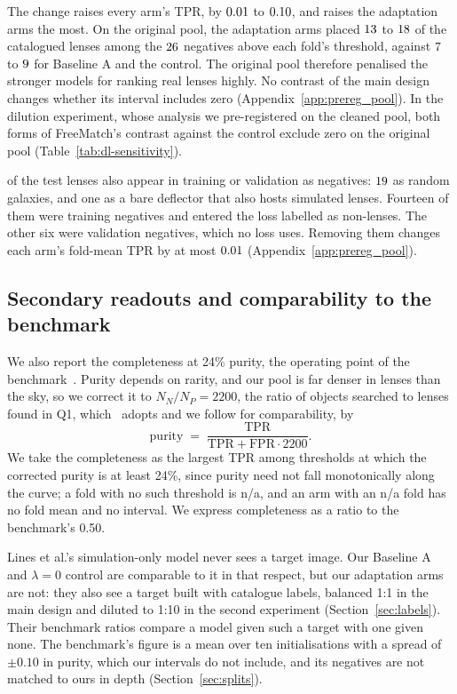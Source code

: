The change raises every arm's TPR, by $0.01{}$ to $0.10{}$, and raises the
adaptation arms the most. On the original pool, the adaptation arms placed $13{}$
to $18{}$ of the \DOneLensNeg{} catalogued lenses among the $26{}$ negatives above
each fold's threshold, against $7{}$ to $9{}$ for Baseline A and
the control. The original pool therefore penalised the stronger models for ranking real
lenses highly. No contrast of the main design changes whether its interval includes zero
(Appendix~\ref{app:prereg_pool}). In the dilution experiment, whose analysis we pre-registered
on the cleaned pool, both forms of FreeMatch's contrast against the control exclude zero on the
original pool (Table~\ref{tab:dl-sensitivity}).

\rwDTwoWord{} of the test lenses also appear in training or validation as negatives: $19{}$ as random galaxies, and one as a bare deflector
that also hosts simulated lenses. Fourteen of them were training negatives and entered the
loss labelled as non-lenses. The other six were validation negatives, which no loss uses.
Removing them changes each arm's fold-mean TPR by at most $0.01{}$
(Appendix~\ref{app:prereg_pool}).

\subsection{Secondary readouts and comparability to the benchmark}
\label{sec:eval-comparability}

We also report the completeness at 24\% purity, the operating point of the
benchmark~\citep{lines2025simstosky}. Purity depends on rarity, and our pool is
far denser in lenses than the sky, so we correct it to $N_N/N_P = 2200$, the ratio of objects
searched to lenses found in Q1, which~\citep{lines2025simstosky} adopts and we follow for
comparability, by
\begin{equation}
  \mathrm{purity} \;=\; \frac{\mathrm{TPR}}{\mathrm{TPR} + \mathrm{FPR} \cdot 2200}.
  \label{eq:purity}
\end{equation}
We take the completeness as the largest TPR among thresholds at which the corrected purity is
at least 24\%, since purity need not fall monotonically along the curve; a fold with no such
threshold is n/a, and an arm with an n/a fold has no fold mean and no interval. We
express completeness as a ratio to the benchmark's 0.50.

Lines et al.'s simulation-only model never sees a target image. Our Baseline A and $\lambda=0$
control are comparable to it in that respect, but our adaptation arms are not: they also see
a target built with catalogue labels, balanced 1:1 in the main design and diluted to 1:10 in
the second experiment (Section~\ref{sec:labels}). Their benchmark ratios compare a model given
such a target with one given none. The benchmark's
figure is a mean over ten initialisations with a spread of $\pm 0.10$ in purity, which our
intervals do not include, and its negatives are not matched to ours in depth
(Section~\ref{sec:splits}).
